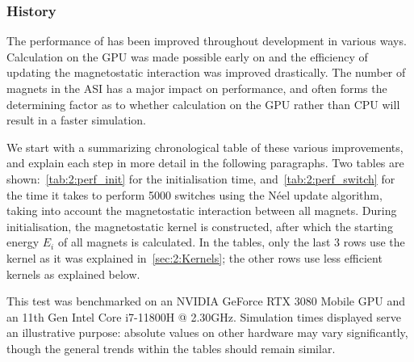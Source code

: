 \subsubsection{History}
The performance of \hotspice has been improved throughout development in various ways.
Calculation on the GPU was made possible early on and the efficiency of updating the magnetostatic interaction was improved drastically.
The number of magnets in the ASI has a major impact on performance, and often forms the determining factor as to whether calculation on the GPU rather than CPU will result in a faster simulation. \par
We start with a summarizing chronological table of these various improvements, and explain each step in more detail in the following paragraphs.
Two tables are shown:~\cref{tab:2:perf_init} for the initialisation time, and~\cref{tab:2:perf_switch} for the time it takes to perform 5000 switches using the N\'eel update algorithm, taking into account the magnetostatic interaction between all magnets.
During initialisation, the magnetostatic kernel is constructed, after which the starting energy $E_i$ of all magnets is calculated.
In the tables, only the last 3 rows use the kernel as it was explained in~\cref{sec:2:Kernels}; the other rows use less efficient kernels as explained below. \par %
This test was benchmarked on an NVIDIA GeForce RTX 3080 Mobile GPU and an 11th Gen Intel\textregistered{} Core\texttrademark{} i7-11800H @ 2.30GHz.
Simulation times displayed serve an illustrative purpose: absolute values on other hardware may vary significantly, though the general trends within the tables should remain similar.

